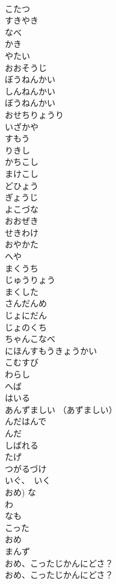 \documentclass[8pt]{extreport}
\begin{document}
\begin{CJK}{UTF8}{min}
\\	こたつ
\\	すきやき
\\	なべ
\\	かき
\\	やたい
\\	おおそうじ
\\	ぼうねんかい
\\	しんねんかい
\\	ぼうねんかい
\\	おせちりょうり
\\	いざかや
\\	すもう
\\	りきし
\\	かちこし
\\	まけこし
\\	どひょう
\\	ぎょうじ
\\	よこづな
\\	おおぜき
\\	せきわけ
\\	おやかた
\\	へや
\\	まくうち
\\	じゅうりょう
\\	まくした
\\	さんだんめ
\\	じょにだん
\\	じょのくち
\\	ちゃんこなべ
\\	にほんすもうきょうかい
\\	こむすび
\\	わらし
\\	へば
\\	はいる
\\	あんずましい （あずましい）
\\	んだはんで
\\	んだ
\\	しばれる
\\	たげ
\\	つがるづけ
\\	いぐ、　いく
\\	おめ)	な
\\	わ
\\	なも
\\	こった
\\	おめ
\\	まんず
\\	おめ、こったじかんにどさ？	
\\	おめ、こったじかんにどさ？ 

\end{CJK}
\end{document}
